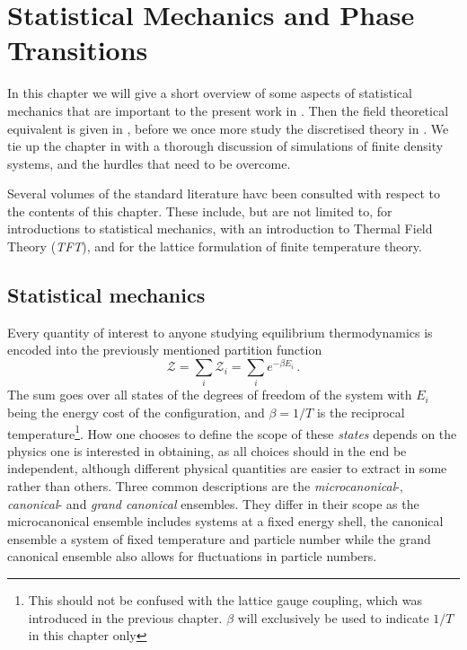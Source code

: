 \chapter{Statistical Mechanics and Phase Transitions} \label{chap3}

In this chapter we will give a short overview of some aspects of statistical
mechanics that are important to the present work in .
Then the field theoretical equivalent is given in
, before we once more study the discretised
theory in . We tie up the chapter 
in  with a
thorough discussion of simulations of finite density systems, and the hurdles
that need to be overcome.

Several volumes of the standard literature havc been consulted with respect to
the contents of this chapter. These include, but are not limited to,
\cite{landau2013statistical,pathria2011statistical} for introductions to
statistical mechanics, \cite{kapusta2006finite} with an introduction to Thermal
Field Theory (\emph{TFT}), and \cite{montvay1997quantum,Philipsen:2010gj} for
the lattice formulation of finite temperature theory.

\section{Statistical mechanics} \label{sec:stat-mech}

Every quantity of interest to anyone studying equilibrium thermodynamics is
encoded into the previously mentioned partition function
%
\begin{equation} \label{eq:sm-partition-function} \mathcal{Z} = \sum_i
  \mathcal{Z}_i = \sum_i e^{-\beta E_i} \,.  \end{equation}
%
The sum goes over all states of the degrees of freedom of the system with $E_i$
being the energy cost of the configuration, and $\beta = 1/T$ is the reciprocal
temperature\footnote{This should not be confused with the lattice gauge
  coupling, which was introduced in the previous chapter. $\beta$ will
  exclusively be used to indicate $1/T$ in this chapter only}. How one chooses
to define the scope of these \emph{states} depends on the physics one is
interested in obtaining, as all choices should in the end be independent,
although different physical quantities are easier to extract in some rather than
others. Three common descriptions are the \emph{microcanonical}-,
\emph{canonical}- and \emph{grand canonical} ensembles.  They differ in their
scope as the microcanonical ensemble includes systems at a fixed energy shell,
the canonical ensemble a system of fixed temperature and particle number while
the grand canonical ensemble also allows for fluctuations in particle numbers.

